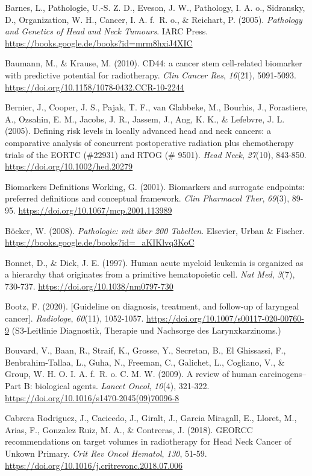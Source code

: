 Barnes, L., Pathologie, U.-S. Z. D., Eveson, J. W., Pathology, I. A. o., Sidransky, D., Organization, W. H., Cancer, I. A. f.~R. o., \& Reichart, P. (2005). \emph{Pathology and Genetics of Head and Neck Tumours}. IARC Press. \url{https://books.google.de/books?id=mrm8hxiJ4XIC}

Baumann, M., \& Krause, M. (2010). CD44: a cancer stem cell-related biomarker with predictive potential for radiotherapy. \emph{Clin Cancer Res}, \emph{16}(21), 5091-5093. \url{https://doi.org/10.1158/1078-0432.CCR-10-2244}

Bernier, J., Cooper, J. S., Pajak, T. F., van Glabbeke, M., Bourhis, J., Forastiere, A., Ozsahin, E. M., Jacobs, J. R., Jassem, J., Ang, K. K., \& Lefebvre, J. L. (2005). Defining risk levels in locally advanced head and neck cancers: a comparative analysis of concurrent postoperative radiation plus chemotherapy trials of the EORTC (\#22931) and RTOG (\# 9501). \emph{Head Neck}, \emph{27}(10), 843-850. \url{https://doi.org/10.1002/hed.20279}

Biomarkers Definitions Working, G. (2001). Biomarkers and surrogate endpoints: preferred definitions and conceptual framework. \emph{Clin Pharmacol Ther}, \emph{69}(3), 89-95. \url{https://doi.org/10.1067/mcp.2001.113989}

Böcker, W. (2008). \emph{Pathologie: mit über 200 Tabellen}. Elsevier, Urban \& Fischer. \url{https://books.google.de/books?id=_aKIKlvq3KoC}

Bonnet, D., \& Dick, J. E. (1997). Human acute myeloid leukemia is organized as a hierarchy that originates from a primitive hematopoietic cell. \emph{Nat Med}, \emph{3}(7), 730-737. \url{https://doi.org/10.1038/nm0797-730}

Bootz, F. (2020). {[}Guideline on diagnosis, treatment, and follow-up of laryngeal cancer{]}. \emph{Radiologe}, \emph{60}(11), 1052-1057. \url{https://doi.org/10.1007/s00117-020-00760-9} (S3-Leitlinie Diagnostik, Therapie und Nachsorge des Larynxkarzinoms.)

Bouvard, V., Baan, R., Straif, K., Grosse, Y., Secretan, B., El Ghissassi, F., Benbrahim-Tallaa, L., Guha, N., Freeman, C., Galichet, L., Cogliano, V., \& Group, W. H. O. I. A. f.~R. o. C. M. W. (2009). A review of human carcinogens--Part B: biological agents. \emph{Lancet Oncol}, \emph{10}(4), 321-322. \url{https://doi.org/10.1016/s1470-2045(09)70096-8}

Cabrera Rodriguez, J., Cacicedo, J., Giralt, J., Garcia Miragall, E., Lloret, M., Arias, F., Gonzalez Ruiz, M. A., \& Contreras, J. (2018). GEORCC recommendations on target volumes in radiotherapy for Head Neck Cancer of Unkown Primary. \emph{Crit Rev Oncol Hematol}, \emph{130}, 51-59. \url{https://doi.org/10.1016/j.critrevonc.2018.07.006}

